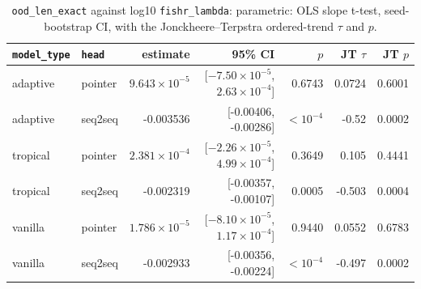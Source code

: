 \documentclass[10pt]{article}
\begin{document}
{\small
\begin{longtable}{llrrrrr}
\caption{\texttt{ood\_len\_exact} against log10 \texttt{fishr\_lambda}: parametric: OLS slope t-test, seed-bootstrap CI, with the Jonckheere--Terpstra ordered-trend $\tau$ and $p$.}\label{tab:trend-ood_len_exact}\\
\toprule
\texttt{model\_type} & \texttt{head} & estimate & 95\% CI & $p$ & JT $\tau$ & JT $p$\\
\midrule
\endhead
adaptive & pointer & $9.643\times10^{-5}$ & [$-7.50\times10^{-5}$, $2.63\times10^{-4}$] & 0.6743 & 0.0724 & 0.6001\\
adaptive & seq2seq & -0.003536 & [-0.00406, -0.00286] & $<10^{-4}$ & -0.52 & 0.0002\\
tropical & pointer & $2.381\times10^{-4}$ & [$-2.26\times10^{-5}$, $4.99\times10^{-4}$] & 0.3649 & 0.105 & 0.4441\\
tropical & seq2seq & -0.002319 & [-0.00357, -0.00107] & 0.0005 & -0.503 & 0.0004\\
vanilla & pointer & $1.786\times10^{-5}$ & [$-8.10\times10^{-5}$, $1.17\times10^{-4}$] & 0.9440 & 0.0552 & 0.6783\\
vanilla & seq2seq & -0.002933 & [-0.00356, -0.00224] & $<10^{-4}$ & -0.497 & 0.0002\\
\bottomrule
\end{longtable}
}
\end{document}
